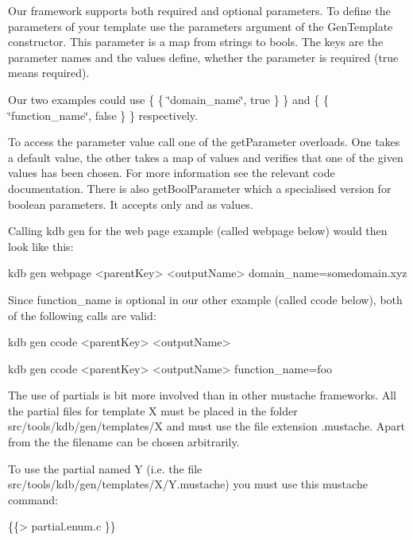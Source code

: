 Our framework supports both required and optional parameters. To define the parameters of your template use the {\ttfamily parameters} argument of the {\ttfamily Gen\+Template} constructor. This parameter is a map from strings to bools. The keys are the parameter names and the values define, whether the parameter is required ({\ttfamily true} means required).

Our two examples could use {\ttfamily \{ \{ \char`\"{}domain\+\_\+name\char`\"{}, true \} \}} and {\ttfamily \{ \{ \char`\"{}function\+\_\+name\char`\"{}, false \} \}} respectively.

To access the parameter value call one of the {\ttfamily get\+Parameter} overloads. One takes a default value, the other takes a map of values and verifies that one of the given values has been chosen. For more information see the relevant code documentation. There is also {\ttfamily get\+Bool\+Parameter} which a specialised version for boolean parameters. It accepts only {} and {} as values.

Calling {\ttfamily kdb gen} for the web page example (called {\ttfamily webpage} below) would then look like this\+:


\begin{DoxyCode}
kdb gen webpage <parentKey> <outputName> domain\_name=somedomain.xyz
\end{DoxyCode}


Since {\ttfamily function\+\_\+name} is optional in our other example (called {\ttfamily ccode} below), both of the following calls are valid\+:


\begin{DoxyCode}
kdb gen ccode <parentKey> <outputName>

kdb gen ccode <parentKey> <outputName> function\_name=foo
\end{DoxyCode}


The use of partials is bit more involved than in other mustache frameworks. All the partial files for template {\ttfamily X} must be placed in the folder {\ttfamily src/tools/kdb/gen/templates/X} and must use the file extension {\ttfamily .mustache}. Apart from the the filename can be chosen arbitrarily.

To use the partial named {\ttfamily Y} (i.\+e. the file {\ttfamily src/tools/kdb/gen/templates/\+X/\+Y.\+mustache}) you must use this mustache command\+:


\begin{DoxyCode}
\{\{> partial.enum.c \}\}
\end{DoxyCode}


